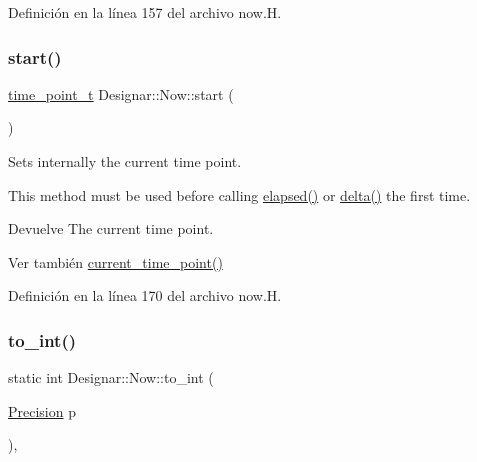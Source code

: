 Definición en la línea 157 del archivo now.\+H.

\mbox{\label{class_designar_1_1_now_a7ccb419799b46b7786b9ad0ac231de14}} 
\subsubsection{\texorpdfstring{start()}{start()}}
{\footnotesize\ttfamily \hyperlink{namespace_designar_a0edbd598eadb672df2c70e5af4dfccee}{time\+\_\+point\+\_\+t} Designar\+::\+Now\+::start (\begin{DoxyParamCaption}{ }\end{DoxyParamCaption})\hspace{0.3cm}{\ttfamily [inline]}}

Sets internally the current time point.

This method must be used before calling \hyperlink{class_designar_1_1_now_a3219d85172fc9628ef90f66c1d69a8e0}{elapsed()} or \hyperlink{class_designar_1_1_now_ae2a46a7ff8392fbadc9fb28ee17f7f5a}{delta()} the first time.

\begin{DoxyReturn}{Devuelve}
The current time point. 
\end{DoxyReturn}
\begin{DoxySeeAlso}{Ver también}
\hyperlink{class_designar_1_1_now_af862bb15a2202e02e31a1d11fac08dcf}{current\+\_\+time\+\_\+point()} 
\end{DoxySeeAlso}


Definición en la línea 170 del archivo now.\+H.

\mbox{\label{class_designar_1_1_now_a24c5b1e6f6d2e7d8030fd4b70a9a1b12}} 
\subsubsection{\texorpdfstring{to\+\_\+int()}{to\_int()}}
{\footnotesize\ttfamily static int Designar\+::\+Now\+::to\+\_\+int (\begin{DoxyParamCaption}\item[{\hyperlink{class_designar_1_1_now_a3c9f5e57907c88cbe63c70a64638c072}{Precision}}]{p }\end{DoxyParamCaption})\hspace{0.3cm}{\ttfamily [inline]}, {\ttfamily [static]}}



